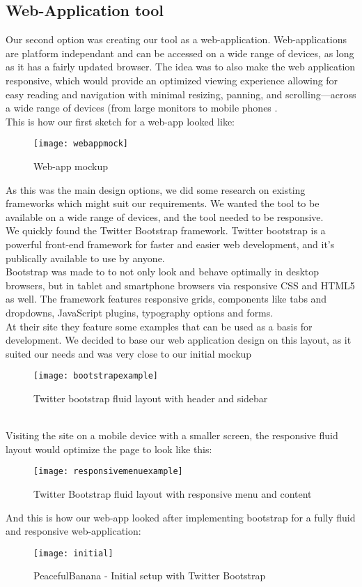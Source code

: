 \subsection{Web-Application tool}
Our second option was creating our tool as a web-application. Web-applications are platform independant and can be accessed on a wide range of devices, as long as it has a fairly updated browser. The idea was to also make the web application responsive, which would provide an optimized viewing experience allowing for easy reading and navigation with minimal resizing, panning, and scrolling—across a wide range of devices (from large monitors to mobile phones .\\
This is how our first sketch for a web-app looked like: 
\begin{figure}[h!]
\label{webappmock}
\centering
	\texttt{[image: webappmock]}
\caption{Web-app mockup}
\end{figure}

As this was the main design options, we did some research on existing frameworks which might suit our requirements. We wanted the tool to be available on a wide range of devices, and the tool needed to be responsive.\\ 
We quickly found the Twitter Bootstrap framework\cite{twitterbootstrap}. Twitter bootstrap is a powerful front-end framework for faster and easier web development, and it's publically available to use by anyone.\\Bootstrap was made to to not only look and behave optimally in desktop browsers, but in tablet and smartphone browsers via responsive CSS and HTML5 as well. The framework features responsive grids, components like tabs and dropdowns, JavaScript plugins, typography options and forms. \\
\newpage
At their site they feature some examples that can be used as a basis for development. We decided to base our web application design on this layout, as it suited our needs and was very close to our initial mockup
\begin{figure}[h!]
\label{bootstrapexample}
\centering
	\texttt{[image: bootstrapexample]}
\caption{Twitter bootstrap fluid layout with header and sidebar}
\end{figure}
\\
Visiting the site on a mobile device with a smaller screen, the responsive fluid layout would optimize the page to look like this:
\begin{figure}[h!]
\label{bootstrapresponsive}
\centering
	\texttt{[image: responsivemenuexample]}
\caption{Twitter Bootstrap fluid layout with responsive menu and content}
\end{figure}
\newpage
And this is how our web-app looked after implementing bootstrap for a fully fluid and responsive web-application:
\begin{figure}[h!]
\label{teamscreen}
\centering
	\texttt{[image: initial]}
\caption{PeacefulBanana - Initial setup with Twitter Bootstrap}
\end{figure}

